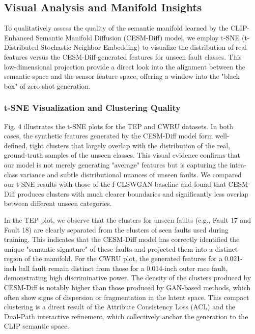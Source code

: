 \subsection{Visual Analysis and Manifold Insights}
\label{sec:visualization}

To qualitatively assess the quality of the semantic manifold learned by the CLIP-Enhanced Semantic Manifold Diffusion (CESM-Diff) model, we employ t-SNE (t-Distributed Stochastic Neighbor Embedding) to visualize the distribution of real features versus the CESM-Diff-generated features for unseen fault classes. This low-dimensional projection provide a direct look into the alignment between the semantic space and the sensor feature space, offering a window into the "black box" of zero-shot generation.

\subsubsection{t-SNE Visualization and Clustering Quality}
Fig. 4 illustrates the t-SNE plots for the TEP and CWRU datasets. In both cases, the synthetic features generated by the CESM-Diff model form well-defined, tight clusters that largely overlap with the distribution of the real, ground-truth samples of the unseen classes. This visual evidence confirms that our model is not merely generating "average" features but is capturing the intra-class variance and subtle distributional nuances of unseen faults. We compared our t-SNE results with those of the f-CLSWGAN baseline and found that CESM-Diff produces clusters with much clearer boundaries and significantly less overlap between different unseen categories.

In the TEP plot, we observe that the clusters for unseen faults (e.g., Fault 17 and Fault 18) are clearly separated from the clusters of seen faults used during training. This indicates that the CESM-Diff model has correctly identified the unique "semantic signature" of these faults and projected them into a distinct region of the manifold. For the CWRU plot, the generated features for a 0.021-inch ball fault remain distinct from those for a 0.014-inch outer race fault, demonstrating high discriminative power. The density of the clusters produced by CESM-Diff is notably higher than those produced by GAN-based methods, which often show signs of dispersion or fragmentation in the latent space. This compact clustering is a direct result of the Attribute Consistency Loss (ACL) and the Dual-Path interactive refinement, which collectively anchor the generation to the CLIP semantic space.

